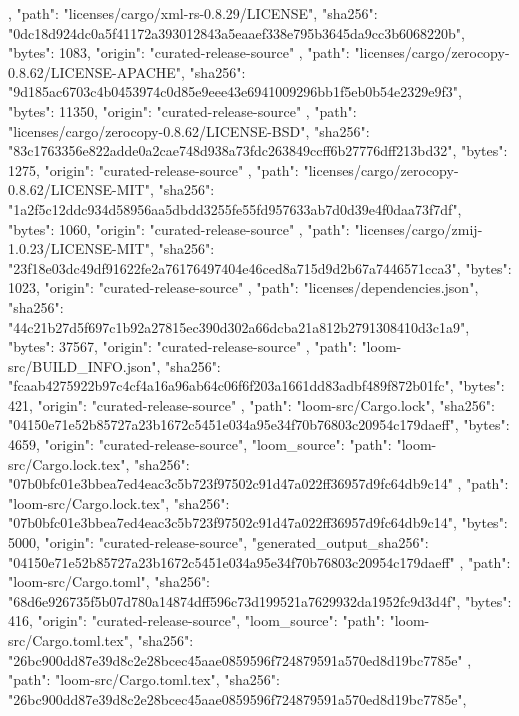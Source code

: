 {{    },
    {
      "path": "licenses/cargo/xml-rs-0.8.29/LICENSE",
      "sha256": "0dc18d924dc0a5f41172a393012843a5eaaef338e795b3645da9cc3b6068220b",
      "bytes": 1083,
      "origin": "curated-release-source"
    },
    {
      "path": "licenses/cargo/zerocopy-0.8.62/LICENSE-APACHE",
      "sha256": "9d185ac6703c4b0453974c0d85e9eee43e6941009296bb1f5eb0b54e2329e9f3",
      "bytes": 11350,
      "origin": "curated-release-source"
    },
    {
      "path": "licenses/cargo/zerocopy-0.8.62/LICENSE-BSD",
      "sha256": "83c1763356e822adde0a2cae748d938a73fdc263849ccff6b27776dff213bd32",
      "bytes": 1275,
      "origin": "curated-release-source"
    },
    {
      "path": "licenses/cargo/zerocopy-0.8.62/LICENSE-MIT",
      "sha256": "1a2f5c12ddc934d58956aa5dbdd3255fe55fd957633ab7d0d39e4f0daa73f7df",
      "bytes": 1060,
      "origin": "curated-release-source"
    },
    {
      "path": "licenses/cargo/zmij-1.0.23/LICENSE-MIT",
      "sha256": "23f18e03dc49df91622fe2a76176497404e46ced8a715d9d2b67a7446571cca3",
      "bytes": 1023,
      "origin": "curated-release-source"
    },
    {
      "path": "licenses/dependencies.json",
      "sha256": "44c21b27d5f697c1b92a27815ec390d302a66dcba21a812b2791308410d3c1a9",
      "bytes": 37567,
      "origin": "curated-release-source"
    },
    {
      "path": "loom-src/BUILD_INFO.json",
      "sha256": "fcaab4275922b97c4cf4a16a96ab64c06f6f203a1661dd83adbf489f872b01fc",
      "bytes": 421,
      "origin": "curated-release-source"
    },
    {
      "path": "loom-src/Cargo.lock",
      "sha256": "04150e71e52b85727a23b1672c5451e034a95e34f70b76803c20954c179daeff",
      "bytes": 4659,
      "origin": "curated-release-source",
      "loom_source": {
        "path": "loom-src/Cargo.lock.tex",
        "sha256": "07b0bfc01e3bbea7ed4eac3c5b723f97502c91d47a022ff36957d9fc64db9c14"
      }
    },
    {
      "path": "loom-src/Cargo.lock.tex",
      "sha256": "07b0bfc01e3bbea7ed4eac3c5b723f97502c91d47a022ff36957d9fc64db9c14",
      "bytes": 5000,
      "origin": "curated-release-source",
      "generated_output_sha256": "04150e71e52b85727a23b1672c5451e034a95e34f70b76803c20954c179daeff"
    },
    {
      "path": "loom-src/Cargo.toml",
      "sha256": "68d6e926735f5b07d780a14874dff596c73d199521a7629932da1952fc9d3d4f",
      "bytes": 416,
      "origin": "curated-release-source",
      "loom_source": {
        "path": "loom-src/Cargo.toml.tex",
        "sha256": "26bc900dd87e39d8c2e28bcec45aae0859596f724879591a570ed8d19bc7785e"
      }
    },
    {
      "path": "loom-src/Cargo.toml.tex",
      "sha256": "26bc900dd87e39d8c2e28bcec45aae0859596f724879591a570ed8d19bc7785e",
}}
